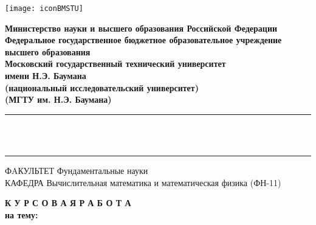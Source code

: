 \begin{titlepage}
    

    \noindent
    \begin{minipage}[c]{0.125\textwidth}
        \texttt{[image: iconBMSTU]}
    \end{minipage}
    \hfill
    \begin{minipage}[c]{0.7\textwidth}
        \begin{spacing}{1}
            \centering
            \bfseries
            \footnotesize
            Министерство науки и высшего образования Российской Федерации \\
            Федеральное государственное бюджетное образовательное учреждение \\
            высшего образования \\
            \guillemotleft Московский государственный технический университет \\
            имени Н.Э. Баумана\guillemotright \\
            (национальный исследовательский университет) \\
            (МГТУ им. Н.Э. Баумана) 
        \end{spacing}
    \end{minipage}
    \hspace{20pt}


    \vspace{0.25cm}
    \noindent\rule{\textwidth}{3pt} \\
    \vspace{-49pt}\\
    \noindent\rule{\textwidth}{0.5pt}

    
    \begin{center}
        ФAКУЛЬТЕТ Фундаментальные науки \\
        КАФЕДРА Вычислительная математика и математическая физика (ФН-11)
    \end{center}

    \vspace{5pt}


    \begin{center}
        \bfseries
        \fontsize{16pt}{19.2pt}\selectfont
        \textsc{ К У Р С О В А Я {\quad} Р А Б О Т А } \\[10pt]
        на тему:
    \end{center}


\end{titlepage}
